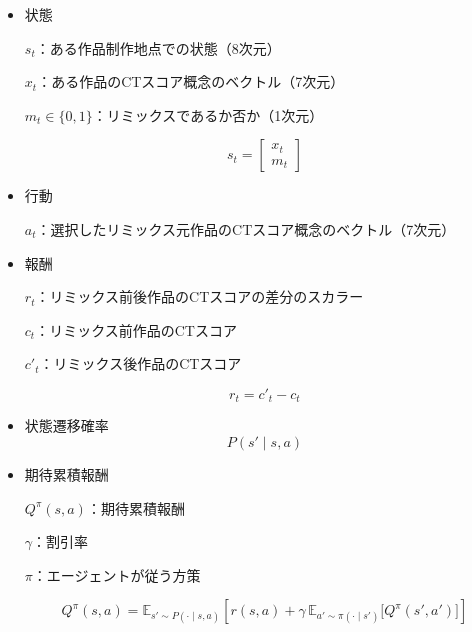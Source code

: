 \documentclass[submit,techrep,noauthor]{ipsj}
\begin{document}
\begin{itemize}
    \item 状態
        
        $s_t$：ある作品制作地点での状態（8次元）
    
        $x_t$：ある作品のCTスコア概念のベクトル（7次元）
    
        $m_t\in\{0,1\}$：リミックスであるか否か（1次元）
    
        \begin{equation}
            s_t = 
            \begin{bmatrix}
               x_t \\
               m_t 
            \end{bmatrix}
        \end{equation}

    \item 行動

        $a_t$：選択したリミックス元作品のCTスコア概念のベクトル（7次元）
    
      
    \item 報酬
    
        $r_t$：リミックス前後作品のCTスコアの差分のスカラー
        
        $c_t$：リミックス前作品のCTスコア
    
        $c'_t$：リミックス後作品のCTスコア
        
        \begin{equation}
            r_t = c'_t - c_t
        \end{equation}
    
        
    
        

    \item 状態遷移確率
        \begin{equation}
            P(s' \mid s, a)
        \end{equation}

    \item 期待累積報酬

        $Q^{\pi}(s, a)$：期待累積報酬
    
        $\gamma$：割引率
        
        $\pi$：エージェントが従う方策

        \begin{equation}
            Q^{\pi}(s, a) = \mathbb{E}_{s' \sim P(\cdot \mid s, a)} 
            \left[ r(s, a) + \gamma \, 
            \mathbb{E}_{a' \sim \pi(\cdot \mid s')} 
            \big[ Q^{\pi}(s', a') \big] \right]
        \end{equation}

\end{itemize}
\end{document}
